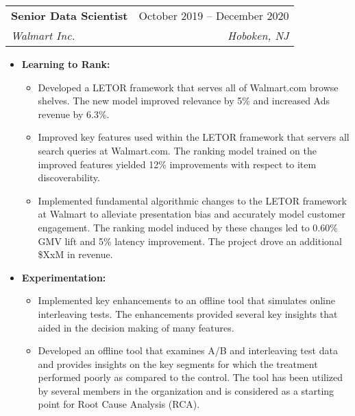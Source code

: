 \documentclass[letterpaper,11pt]{article}
\makeatletter
\newcommand{\resumeItem}[1]{
  \item\small{
    {#1 \vspace{-2pt}}
  }
}
\newcommand{\resumeSubheading}[4]{
  \vspace{-2pt}\item
    \begin{tabular*}{0.97\textwidth}[t]{l@{\extracolsep{\fill}}r}
      \textbf{#1} & #2 \\
      \textit{\small#3} & \textit{\small #4} \\
    \end{tabular*}\vspace{-7pt}
}
\newcommand{\resumeItemListStart}{\begin{itemize}}
\newcommand{\resumeItemListEnd}{\end{itemize}\vspace{-4.5pt}}
\makeatother
\begin{document}
      \vspace{1mm}
       \resumeSubheading
      {Senior Data Scientist}{October 2019 -- December 2020}
      {Walmart Inc.}{Hoboken, NJ}
      \resumeItemListStart
        \resumeItem{{\bf Learning to Rank:} 
       \begin{itemize}
        \item Developed a LETOR framework that serves all of Walmart.com browse shelves. The new model improved relevance by 5\% and increased Ads revenue by 6.3\%.
        \item Improved key features used within the LETOR framework that servers all search queries at Walmart.com. The ranking model trained on the improved features yielded 12\% improvements with respect to item discoverability.
           \item Implemented fundamental algorithmic changes to the LETOR framework at Walmart to alleviate presentation bias and accurately model customer engagement. The ranking model induced by these changes led to 0.60\% GMV lift and 5\% latency improvement. The project drove an additional \$XxM in revenue.
        \end{itemize}
    }
        \resumeItem{{\bf Experimentation:}}
        \begin{itemize}
        \item Implemented key enhancements to an offline tool that simulates online interleaving tests. The enhancements provided several key insights that aided in the decision making of many features.
        \item Developed an offline tool that examines A/B and interleaving test data and provides insights on the key segments for which the treatment performed poorly as compared to the control. The tool has been utilized by several members in the organization and is considered as a starting point for Root Cause Analysis (RCA).
        	\end{itemize}
      \resumeItemListEnd
      
\end{document}
